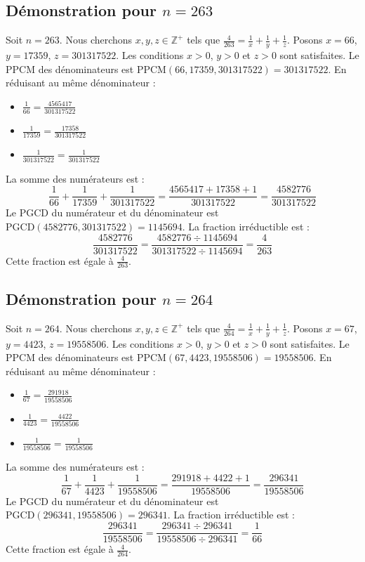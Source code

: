 \documentclass[11pt,a4paper]{article}
\begin{document}
\subsection{Démonstration pour $n = 263$}
Soit $n = 263$. Nous cherchons $x, y, z \in \mathbb{Z}^{+}$ tels que $\frac{4}{263} = \frac{1}{x} + \frac{1}{y} + \frac{1}{z}$.
Posons $x = 66$, $y = 17359$, $z = 301317522$.
Les conditions $x > 0$, $y > 0$ et $z > 0$ sont satisfaites.
Le PPCM des dénominateurs est $\text{PPCM}(66, 17359, 301317522) = 301317522$.
En réduisant au même dénominateur :
\begin{itemize}
    \item $\frac{1}{66} = \frac{4565417}{301317522}$
    \item $\frac{1}{17359} = \frac{17358}{301317522}$
    \item $\frac{1}{301317522} = \frac{1}{301317522}$
\end{itemize}
La somme des numérateurs est :
$$ \frac{1}{66} + \frac{1}{17359} + \frac{1}{301317522} = \frac{4565417 + 17358 + 1}{301317522} = \frac{4582776}{301317522} $$
Le PGCD du numérateur et du dénominateur est $\text{PGCD}(4582776, 301317522) = 1145694$.
La fraction irréductible est :
$$ \frac{4582776}{301317522} = \frac{4582776 \div 1145694}{301317522 \div 1145694} = \frac{4}{263} $$
Cette fraction est égale à $\frac{4}{263}$.

\subsection{Démonstration pour $n = 264$}
Soit $n = 264$. Nous cherchons $x, y, z \in \mathbb{Z}^{+}$ tels que $\frac{4}{264} = \frac{1}{x} + \frac{1}{y} + \frac{1}{z}$.
Posons $x = 67$, $y = 4423$, $z = 19558506$.
Les conditions $x > 0$, $y > 0$ et $z > 0$ sont satisfaites.
Le PPCM des dénominateurs est $\text{PPCM}(67, 4423, 19558506) = 19558506$.
En réduisant au même dénominateur :
\begin{itemize}
    \item $\frac{1}{67} = \frac{291918}{19558506}$
    \item $\frac{1}{4423} = \frac{4422}{19558506}$
    \item $\frac{1}{19558506} = \frac{1}{19558506}$
\end{itemize}
La somme des numérateurs est :
$$ \frac{1}{67} + \frac{1}{4423} + \frac{1}{19558506} = \frac{291918 + 4422 + 1}{19558506} = \frac{296341}{19558506} $$
Le PGCD du numérateur et du dénominateur est $\text{PGCD}(296341, 19558506) = 296341$.
La fraction irréductible est :
$$ \frac{296341}{19558506} = \frac{296341 \div 296341}{19558506 \div 296341} = \frac{1}{66} $$
Cette fraction est égale à $\frac{4}{264}$.
\end{document}
